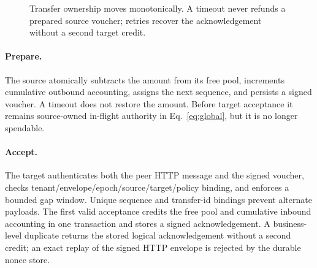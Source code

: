 \documentclass[10pt]{article}
\begin{document}
\begin{figure}[ht]
\centering
{}\par
\caption{Transfer ownership moves monotonically. A timeout never refunds a prepared source
voucher; retries recover the acknowledgement without a second target credit.}
\label{fig:transfer}
\end{figure}

\paragraph{Prepare.} The source atomically subtracts the amount from its free pool, increments
cumulative outbound accounting, assigns the next sequence, and persists a signed voucher. A
timeout does not restore the amount. Before target acceptance it remains source-owned in-flight
authority in Eq.~\ref{eq:global}, but it is no longer spendable.

\paragraph{Accept.} The target authenticates both the peer HTTP message and the signed voucher,
checks tenant/envelope/epoch/source/target/policy binding, and enforces a bounded gap window.
Unique sequence and transfer-id bindings prevent alternate payloads. The first valid acceptance
credits the free pool and cumulative inbound accounting in one transaction and stores a signed
acknowledgement. A business-level duplicate returns the stored logical acknowledgement without a
second credit; an exact replay of the signed HTTP envelope is rejected by the durable nonce store.
\end{document}
